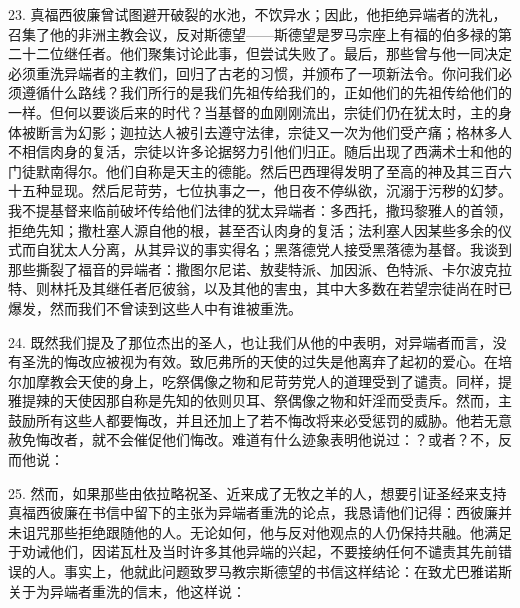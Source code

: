 23. 真福西彼廉曾试图避开破裂的水池，不饮异水；因此，他拒绝异端者的洗礼，召集了他的非洲主教会议，反对斯德望——斯德望是罗马宗座上有福的伯多禄的第二十二位继任者。他们聚集讨论此事，但尝试失败了。最后，那些曾与他一同决定必须重洗异端者的主教们，回归了古老的习惯，并颁布了一项新法令。你问我们必须遵循什么路线？我们所行的是我们先祖传给我们的，正如他们的先祖传给他们的一样。但何以要谈后来的时代？当基督的血刚刚流出，宗徒们仍在犹太时，主的身体被断言为幻影；迦拉达人被引去遵守法律，宗徒又一次为他们受产痛；格林多人不相信肉身的复活，宗徒以许多论据努力引他们归正。随后出现了西满术士和他的门徒默南得尔。他们自称是天主的德能。然后巴西理得发明了至高的神及其三百六十五种显现。然后尼苛劳，七位执事之一，他日夜不停纵欲，沉溺于污秽的幻梦。我不提基督来临前破坏传给他们法律的犹太异端者：多西托，撒玛黎雅人的首领，拒绝先知；撒杜塞人源自他的根，甚至否认肉身的复活；法利塞人因某些多余的仪式而自犹太人分离，从其异议的事实得名；黑落德党人接受黑落德为基督。我谈到那些撕裂了福音的异端者：撒图尔尼诺、敖斐特派、加因派、色特派、卡尔波克拉特、则林托及其继任者厄彼翁，以及其他的害虫，其中大多数在若望宗徒尚在时已爆发，然而我们不曾读到这些人中有谁被重洗。\par

24. 既然我们提及了那位杰出的圣人，也让我们从他的中表明，对异端者而言，没有圣洗的悔改应被视为有效。致厄弗所的天使的过失是他离弃了起初的爱心。在培尔加摩教会天使的身上，吃祭偶像之物和尼苛劳党人的道理受到了谴责。同样，提雅提辣的天使因那自称是先知的依则贝耳、祭偶像之物和奸淫而受责斥。然而，主鼓励所有这些人都要悔改，并且还加上了若不悔改将来必受惩罚的威胁。他若无意赦免悔改者，就不会催促他们悔改。难道有什么迹象表明他说过：？或者？不，反而他说：\par

25. 然而，如果那些由依拉略祝圣、近来成了无牧之羊的人，想要引证圣经来支持真福西彼廉在书信中留下的主张为异端者重洗的论点，我恳请他们记得：西彼廉并未诅咒那些拒绝跟随他的人。无论如何，他与反对他观点的人仍保持共融。他满足于劝诫他们，因诺瓦杜及当时许多其他异端的兴起，不要接纳任何不谴责其先前错误的人。事实上，他就此问题致罗马教宗斯德望的书信这样结论：在致尤巴雅诺斯关于为异端者重洗的信末，他这样说：\par

